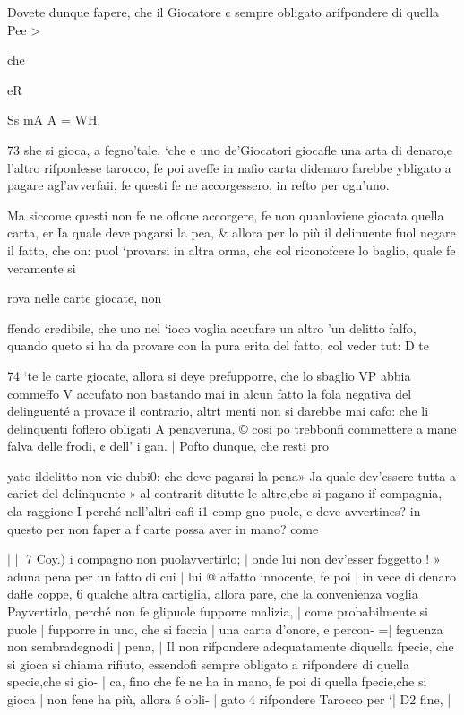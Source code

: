 \documentclass[12pt,a6paper]{article}
\begin{document}
Dovete dunque fapere, che
il Giocatore ¢ sempre obligato
arifpondere di quella Pee >

che

eR

Ss mA A = WH.

 
 

73
she si gioca, a fegno'tale, ‘che
e uno de’Giocatori giocafle una
arta di denaro,e l’altro rifponlesse tarocco, fe poi aveffe in
nafio carta didenaro farebbe
ybligato a pagare agl’avverfaii, fe questi fe ne accorgessero,
in refto per ogn’uno.

Ma siccome questi non fe ne
oflone accorgere, fe non quanloviene giocata quella carta,
er Ia quale deve pagarsi la pea, & allora per lo più il delinuente fuol negare il fatto, che
on: puol ‘provarsi in altra
orma, che col riconofcere lo
baglio, quale fe veramente si

rova nelle carte giocate, non

ffendo credibile, che uno nel
‘ioco voglia accufare un altro
’un delitto falfo, quando queto si ha da provare con la pura
erita del fatto, col veder tut:
D te
 

 

 

 

74
‘te le carte giocate, allora si deye prefupporre, che lo sbaglio
VP abbia commeffo V accufato
non bastando mai in alcun fatto
la fola negativa del delinguenté
a provare il contrario, altrt
menti non si darebbe mai cafo:
che li delinquenti foflero obligati A penaveruna, © cosi po
trebbonfi commettere a mane
falva delle frodi, ¢ dell’ i
gan. |
Pofto dunque, che resti pro

yato ildelitto non vie dubi0:
che deve pagarsi la pena» Ja
quale dev'essere tutta a carict
del delinquente » al contrarit
ditutte le altre,cbe si pagano if
compagnia, ela raggione I
perché nell’altri cafi i1 comp
gno puole, e deve avvertines?
in questo per non faper a f
carte possa aver in mano?
come

 

| |
7
Coy.) i
compagno non puolavvertirlo; |
onde lui non dev’esser foggetto !
» aduna pena per un fatto di cui |
lui @ affatto innocente, fe poi |
in vece di denaro dafle coppe, 6
qualche altra cartiglia, allora
pare, che la convenienza voglia Payvertirlo, perché non
fe glipuole fupporre malizia, |
come probabilmente si puole |
fupporre in uno, che si faccia |
una carta d’onore, e percon- =|
feguenza non sembradegnodi |
pena, |
Il non rifpondere adequatamente diquella fpecie, che si
gioca si chiama rifiuto, essendofi sempre obligato a rifpondere di quella specie,che si gio- |
ca, fino che fe ne ha in mano, fe
poi di quella fpecie,che si gioca |
non fene ha più, allora é obli- |
gato 4 rifpondere Tarocco per ‘|
D2 fine, |
\end{document}
